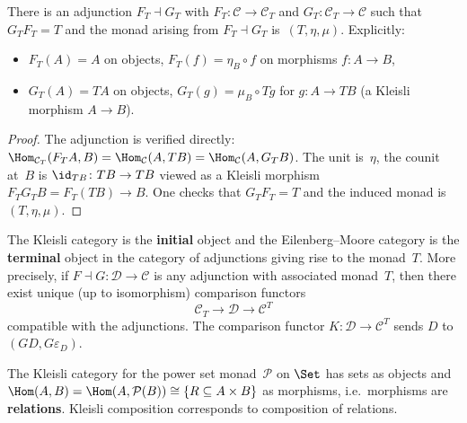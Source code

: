 \begin{proposition}\label{prop:kleisli-adjunction}
There is an adjunction $F_T\dashv G_T$ with
$F_T\colon\mathcal{C}\to\mathcal{C}_T$ and
$G_T\colon\mathcal{C}_T\to\mathcal{C}$ such that $G_TF_T = T$
and the monad arising from $F_T\dashv G_T$ is~$(T,\eta,\mu)$.
Explicitly:
\begin{itemize}
\item $F_T(A) = A$ on objects, $F_T(f) = \eta_B\circ f$ on morphisms
    $f\colon A\to B$,
\item $G_T(A) = TA$ on objects, $G_T(g) = \mu_B\circ Tg$ for
    $g\colon A\to TB$ (a Kleisli morphism $A\to B$).
\end{itemize}
\end{proposition}

\begin{proof}
The adjunction is verified directly:
$\Hom_{\mathcal{C}_T}(F_TA,B) = \Hom_{\mathcal{C}}(A,TB) = \Hom_{\mathcal{C}}(A,G_TB)$.
The unit is~$\eta$, the counit at~$B$ is $\id_{TB}\colon TB\to TB$
viewed as a Kleisli morphism $F_TG_TB = F_T(TB)\to B$.
One checks that $G_TF_T = T$ and the induced monad is $(T,\eta,\mu)$.
\end{proof}

\begin{remark}\label{rem:kleisli-em-universal}
The Kleisli category is the \textbf{initial} object and the
Eilenberg--Moore category is the \textbf{terminal} object in the
category of adjunctions giving rise to the monad~$T$.
More precisely, if $F\dashv G\colon\mathcal{D}\to\mathcal{C}$ is
any adjunction with associated monad~$T$, then there exist unique
(up to isomorphism) comparison functors
\[
    \mathcal{C}_T \longrightarrow \mathcal{D}
    \longrightarrow \mathcal{C}^T
\]
compatible with the adjunctions.  The comparison functor
$K\colon\mathcal{D}\to\mathcal{C}^T$ sends $D$ to $(GD,G\varepsilon_D)$.
\end{remark}

\begin{example}\label{ex:kleisli-powerset}
The Kleisli category for the power set monad~$\mathcal{P}$ on $\Set$
has sets as objects and $\Hom(A,B) = \Hom(A,\mathcal{P}(B)) \cong
\{R\subseteq A\times B\}$ as morphisms, i.e.\ morphisms are
\textbf{relations}.  Kleisli composition corresponds to composition
of relations.
\end{example}

